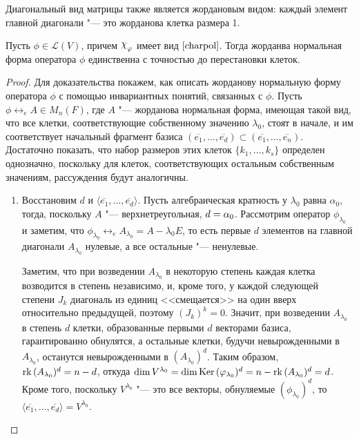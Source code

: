 \begin{note}
	Диагональный вид матрицы также является жордановым видом: каждый элемент главной диагонали "--- это жорданова клетка размера 1.
\end{note}

\begin{theorem}
	Пусть $\phi \in \mathcal{L}(V)$, причем $\Chi_\phi$ имеет вид $\eqref*{charpol}$. Тогда жорданва нормальная форма оператора $\phi$ единственна с точностью до перестановки клеток.
\end{theorem}

\begin{proof}
	Для доказательства покажем, как описать жорданову нормальную форму оператора $\phi$ с помощью инвариантных понятий, связанных с $\phi$. Пусть $\phi \leftrightarrow_e A \in M_n(F)$, где $A$ "--- жорданова нормальная форма, имеющая такой вид, что все клетки, соответствующие собственному значению $\lambda_0$, стоят в начале, и им соответствует начальный фрагмент базиса $(\overline{e_1},\dots,\overline{e_d}) \subset (\overline{e_1},\dots,\overline{e_n})$. Достаточно показать, что набор размеров этих клеток $\{k_1, \dots, k_s\}$ определен однозначно, поскольку для клеток, соответствующих остальным собственным значениям, рассуждения будут аналогичны.
	
	\begin{enumerate}
		\item Восстановим $d$ и $\langle\overline{e_1}, \dots, \overline{e_d}\rangle$. Пусть алгебраическая кратность у $\lambda_0$ равна $\alpha_0$, тогда, поскольку $A$ "--- верхнетреугольная, $d \hm{=} \alpha_0$. Рассмотрим оператор $\phi_{\lambda_0}$ и заметим, что $\phi_{\lambda_0} \leftrightarrow_e A_{\lambda_0} = A -\lambda_0E$, то есть первые $d$ элементов на главной диагонали $A_{\lambda_0}$ нулевые, а все остальные "--- ненулевые.
		
		Заметим, что при возведении $A_{\lambda_0}$ в некоторую степень каждая клетка возводится в степень независимо, и, кроме того, у каждой следующей степени $J_k$ диагональ из единиц <<смещается>> на один вверх относительно предыдущей, поэтому $(J_k)^k = 0$. Значит, при возведении $A_{\lambda_0}$ в степень $d$ клетки, образованные первыми $d$ векторами базиса, гарантированно обнулятся, а остальные клетки, будучи невырожденными в $A_{\lambda_0}$, останутся невырожденными в $(A_{\lambda_0})^d$. Таким образом, $\operatorname{rk}{(A_{\lambda_0})^d} = n - d$, откуда $\dim{V^{\lambda_0}} = \dim{\operatorname{Ker}{(\ensuremath{\varphi}_{\lambda_0})^d}} = n - \operatorname{rk}{(A_{\lambda_0})^d} = d$. Кроме того, поскольку $V^{\lambda_0}$ "--- это все векторы, обнуляемые $(\phi_{\lambda_0})^d$, то $\langle\overline{e_1}, \dots, \overline{e_d}\rangle = V^{\lambda_0}$.
		

\end{enumerate}
\end{proof}
